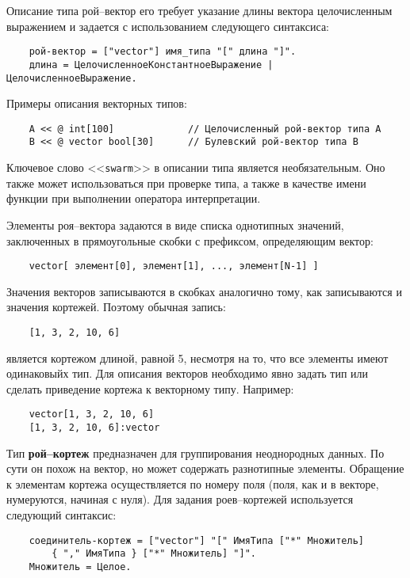 {Описание типа рой--вектор его требует указание длины вектора целочисленным выражением и задается с использованием следующего синтаксиса:

\begin{verbatim}
    рой-вектор = ["vector"] имя_типа "[" длина "]".
    длина = ЦелочисленноеКонстантноеВыражение | ЦелочисленноеВыражение.
\end{verbatim}

Примеры описания векторных типов:

\begin{verbatim}
    A << @ int[100]             // Целочисленный рой-вектор типа А
    B << @ vector bool[30]      // Булевский рой-вектор типа B
\end{verbatim}

Ключевое слово <<\verb|swarm|>> в описании типа является необязательным. Оно также может использоваться при проверке типа, а также в качестве имени функции при выполнении оператора интерпретации.

Элементы роя--вектора задаются в виде списка однотипных значений, заключенных в прямоугольные скобки с префиксом, определяющим вектор:

\begin{verbatim}
    vector[ элемент[0], элемент[1], ..., элемент[N-1] ]
\end{verbatim}
Значения векторов записываются в скобках аналогично тому, как записываются и значения кортежей. Поэтому обычная запись:

\begin{verbatim}
    [1, 3, 2, 10, 6]
\end{verbatim}

является кортежом длиной, равной 5, несмотря на то, что все элементы имеют одинаковыйх тип. Для описания векторов необходимо явно задать тип или сделать приведение кортежа к векторному типу. Например:

\begin{verbatim}
    vector[1, 3, 2, 10, 6]
    [1, 3, 2, 10, 6]:vector
\end{verbatim}

Тип \textbf{рой--кортеж} предназначен для группирования неоднородных данных. По сути он похож на вектор, но может содержать разнотипные элементы. Обращение к элементам кортежа осуществляется по номеру поля (поля, как и в векторе, нумеруются, начиная с нуля). Для задания роев--кортежей используется следующий синтаксис:

\begin{verbatim}
    соединитель-кортеж = ["vector"] "[" ИмяТипа ["*" Множитель]
        { "," ИмяТипа } ["*" Множитель] "]".
    Множитель = Целое.
\end{verbatim}

}
